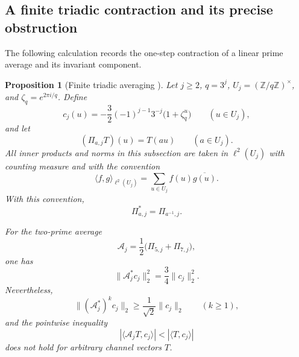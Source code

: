 \documentclass[11pt]{amsart}
\numberwithin{equation}{section}
\theoremstyle{plain}
\newtheorem{proposition}[theorem]{Proposition}
\theoremstyle{definition}
\theoremstyle{remark}
\begin{document}
\subsection{A finite triadic contraction and its precise obstruction}
\label{subsec:triadic_contraction_obstruction}

The following calculation records the one-step contraction of a linear prime average and its invariant component.

\begin{proposition}[Finite triadic averaging {\normalfont[Unconditional]}]
\label{prop:finite_triadic_averaging}
Let $j\geq2$, $q=3^j$, $U_j=(\mathbb Z/q\mathbb Z)^\times$, and $\zeta_q=e^{2\pi i/q}$.  Define
\begin{equation}
c_j(u)
=
-\frac32(-1)^{j-1}3^{-j}\bigl(1+\zeta_q^u\bigr)
\qquad(u\in U_j),
\label{eq:triadic_coefficient_vector}
\end{equation}
and let
\begin{equation}
(\Pi_{a,j}T)(u)=T(au)
\qquad(a\in U_j).
\label{eq:triadic_permutation_operator}
\end{equation}
All inner products and norms in this subsection are taken in $\ell^2(U_j)$ with counting measure and with the convention
\begin{equation}
\langle f,g\rangle_{\ell^2(U_j)}
=
\sum_{u\in U_j}f(u)\overline{g(u)}.
\label{eq:triadic_inner_product_convention}
\end{equation}
With this convention,
\begin{equation}
\Pi_{a,j}^*=\Pi_{a^{-1},j}.
\label{eq:triadic_adjoint_formula}
\end{equation}

\noindent
For the two-prime average
\begin{equation}
\mathcal A_j=\frac12\bigl(\Pi_{5,j}+\Pi_{7,j}\bigr),
\label{eq:two_prime_triadic_average}
\end{equation}
one has
\begin{equation}
\|\mathcal A_j^*c_j\|_2^2
=
\frac34\|c_j\|_2^2.
\label{eq:one_step_triadic_contraction}
\end{equation}
Nevertheless,
\begin{equation}
\|(\mathcal A_j^*)^kc_j\|_2
\geq
\frac{1}{\sqrt2}\|c_j\|_2
\qquad(k\geq1),
\label{eq:triadic_invariant_lower_bound}
\end{equation}
and the pointwise inequality
\begin{equation}
|\langle \mathcal A_jT,c_j\rangle|
<
|\langle T,c_j\rangle|
\label{eq:false_pointwise_contraction}
\end{equation}
does not hold for arbitrary channel vectors $T$.
\end{proposition}
\end{document}
